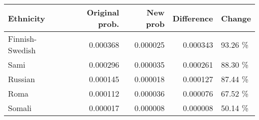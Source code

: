 \begin{tabular}{lrrrl}
\toprule
      Ethnicity &  Original prob. &  New prob &  Difference &  Change \\
\midrule
Finnish-Swedish &        0.000368 &  0.000025 &    0.000343 & 93.26 \% \\
           Sami &        0.000296 &  0.000035 &    0.000261 & 88.30 \% \\
        Russian &        0.000145 &  0.000018 &    0.000127 & 87.44 \% \\
           Roma &        0.000112 &  0.000036 &    0.000076 & 67.52 \% \\
         Somali &        0.000017 &  0.000008 &    0.000008 & 50.14 \% \\
\bottomrule
\end{tabular}
